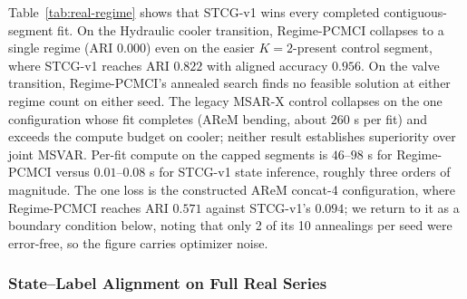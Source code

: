 \documentclass[sigconf,anonymous]{acmart}
\begin{document}
\begin{table}[t]
\caption{Descriptive regime recovery on capped real transition segments: window-level ARI with aligned accuracy in parentheses. All methods receive the indicated $K$; ``present'' is the number of regimes in the segment. STCG's acceptance threshold is zero. MSAR-X is the legacy independent-equation control, not joint MSVAR. $^{\dagger}$MSAR-X exceeded the per-call compute budget (two attempts, 295 s each). $^{\ddagger}$No Regime-PCMCI annealing converged on either seed. --- marks unrun combinations.}
\label{tab:real-regime}
\centering
\small
\resizebox{\linewidth}{!}{}
\end{table}

Table~\ref{tab:real-regime} shows that STCG-v1 wins every completed contiguous-segment fit.
On the Hydraulic cooler transition, Regime-PCMCI collapses to a single regime (ARI $0.000$) even on the easier $K{=}2$-present control segment, where STCG-v1 reaches ARI $0.822$ with aligned accuracy $0.956$.
On the valve transition, Regime-PCMCI's annealed search finds no feasible solution at either regime count on either seed.
The legacy MSAR-X control collapses on the one configuration whose fit completes (AReM bending, about $260$ s per fit) and exceeds the compute budget on cooler; neither result establishes superiority over joint MSVAR.
Per-fit compute on the capped segments is $46$--$98$ s for Regime-PCMCI versus $0.01$--$0.08$ s for STCG-v1 state inference, roughly three orders of magnitude.
The one loss is the constructed AReM concat-4 configuration, where Regime-PCMCI reaches ARI $0.571$ against STCG-v1's $0.094$; we return to it as a boundary condition below, noting that only 2 of its 10 annealings per seed were error-free, so the figure carries optimizer noise.

\subsubsection{State--Label Alignment on Full Real Series}
\label{sec:exp-real-alignment}
\end{document}
